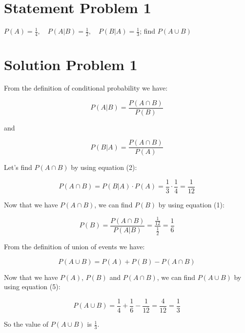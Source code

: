 \section*{Statement Problem 1}

$P(A) = \frac{1}{4}, \quad P(A|B) = \frac{1}{2}, \quad P(B|A) = \frac{1}{3}$; find $P(A \cup B)$

\section*{Solution Problem 1}

From the definition of conditional probability we have:

\begin{equation}
    P(A|B) = \frac{P(A \cap B)}{P(B)}
\end{equation}

and

\begin{equation}
    P(B|A) = \frac{P(A \cap B)}{P(A)}
\end{equation}

Let's find $P(A \cap B)$ by using equation (2):

\begin{equation}
    P(A \cap B) = P(B|A) \cdot P(A) = \frac{1}{3} \cdot \frac{1}{4} = \frac{1}{12}
\end{equation}

Now that we have $P(A \cap B)$, we can find $P(B)$ by using equation (1):

\begin{equation}
    P(B) = \frac{P(A \cap B)}{P(A|B)} = \frac{\frac{1}{12}}{\frac{1}{2}} = \frac{1}{6}
\end{equation}

From the definition of union of events we have:

\begin{equation}
    P(A \cup B) = P(A) + P(B) - P(A \cap B)
\end{equation}

Now that we have $P(A)$, $P(B)$ and $P(A \cap B)$, we can find $P(A \cup B)$ by using equation (5):

\begin{equation}
    P(A \cup B) = \frac{1}{4} + \frac{1}{6} - \frac{1}{12} = \frac{4}{12} = \frac{1}{3}
\end{equation}

So the value of $P(A \cup B)$ is $\frac{1}{3}$.